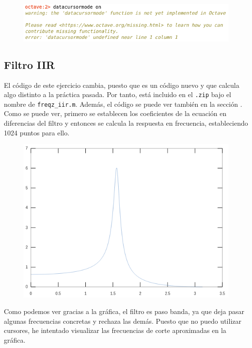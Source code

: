 \documentclass[11pt,a4paper]{article}
\begin{document}
\begin{figure}[H]
	\centering
	\includegraphics[scale=0.5]{img/cursor.png}
\end{figure}

\subsection{Filtro IIR}
El código de este ejercicio cambia, puesto que es un código nuevo y que calcula algo distinto a la práctica pasada. Por tanto, está incluido en el \texttt{.zip} bajo el nombre de \texttt{freqz\_iir.m}. Además, el código se puede ver también en la sección \color{deepred}\color{black}.\\

Como se puede ver, primero se establecen los coeficientes de la ecuación en diferencias del filtro y entonces se calcula la respuesta en frecuencia, estableciendo 1024 puntos para ello.

\begin{figure}[H]
	\centering
	\includegraphics[scale=0.4]{img/freqz-iir.png}
\end{figure}

Como podemos ver gracias a la gráfica, el filtro es paso banda, ya que deja pasar algunas frecuencias concretas y rechaza las demás. Puesto que no puedo utilizar cursores, he intentado visualizar las frecuencias de corte aproximadas en la gráfica.\\
\end{document}
